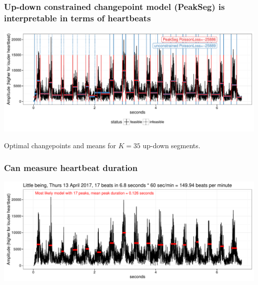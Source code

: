 \documentclass{beamer}
\begin{document}
\begin{frame}
  \frametitle{Up-down constrained changepoint
model (PeakSeg) is interpretable in terms of heartbeats}
  \includegraphics[width=\textwidth]{figure-heartbeat-PeakSeg}

Optimal changepoints and means for $K=35$ up-down segments.
\end{frame}

\begin{frame}
  \frametitle{Can measure heartbeat duration}
  \includegraphics[width=\textwidth]{figure-heartbeat}
\end{frame}
 
\end{document}
